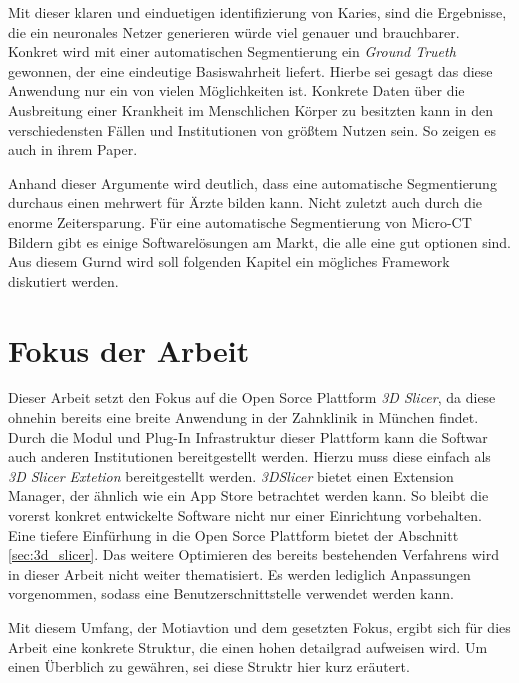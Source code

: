 Mit dieser klaren und einduetigen identifizierung von Karies, sind die Ergebnisse,
die ein neuronales Netzer generieren würde viel genauer und brauchbarer. Konkret
wird mit einer automatischen Segmentierung ein \textit{Ground Trueth} gewonnen, der
eine eindeutige Basiswahrheit liefert. Hierbe sei gesagt das diese Anwendung nur
ein von vielen Möglichkeiten ist. Konkrete Daten über die Ausbreitung einer Krankheit
im Menschlichen Körper zu besitzten kann in den verschiedensten Fällen und Institutionen
von größtem Nutzen sein. So zeigen es auch \citet{de20083d} in ihrem Paper.

Anhand dieser Argumente wird deutlich, dass eine automatische Segmentierung
durchaus einen mehrwert für Ärzte bilden kann. Nicht zuletzt auch durch die enorme
Zeitersparung. Für eine automatische Segmentierung von Micro-CT Bildern gibt es
einige Softwarelösungen am Markt, die alle eine gut optionen sind. Aus diesem
Gurnd wird soll folgenden Kapitel ein mögliches Framework diskutiert werden.

\section{Fokus der Arbeit}
\label{sec:fokus_der-arbeit} Dieser Arbeit setzt den Fokus auf die Open Sorce
Plattform \textit{3D Slicer}, da diese ohnehin bereits eine breite Anwendung in
der Zahnklinik in München findet. Durch die Modul und Plug-In Infrastruktur dieser
Plattform kann die Softwar auch anderen Institutionen bereitgestellt werden.
Hierzu muss diese einfach als \textit{3D Slicer Extetion} bereitgestellt werden.
\textit{3DSlicer} bietet einen Extension Manager, der ähnlich wie ein App Store
betrachtet werden kann. So bleibt die vorerst konkret entwickelte Software nicht
nur einer Einrichtung vorbehalten. Eine tiefere Einfürhung in die Open Sorce
Plattform bietet der Abschnitt \ref{sec:3d_slicer}. Das weitere Optimieren des bereits
bestehenden Verfahrens wird in dieser Arbeit nicht weiter thematisiert. Es
werden lediglich Anpassungen vorgenommen, sodass eine Benutzerschnittstelle verwendet
werden kann.

Mit diesem Umfang, der Motiavtion und dem gesetzten Fokus, ergibt sich für dies Arbeit
eine konkrete Struktur, die einen hohen detailgrad aufweisen wird. Um einen Überblich
zu gewähren, sei diese Struktr hier kurz eräutert.

